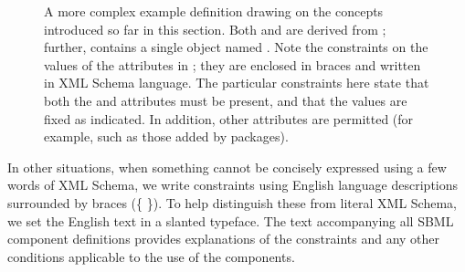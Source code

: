 \begin{figure}[t]
  \centering
  \small
  \caption{A more complex example definition drawing on the
    concepts introduced so far in this section.  Both 
    and  are derived from ;
    further,  contains a single  object
    named .  Note the constraints on the values of
    the attributes in ; they are enclosed in braces
    and written in XML Schema language.  The particular
    constraints here state that both the  and
     attributes must be present, and that the
    values are fixed as indicated.  In addition, other attributes
    are permitted (for example, such as those added by \thisL
    packages).}
  \label{fig:unit-eg}
\end{figure}

In other situations, when something cannot be concisely expressed
using a few words of XML Schema, we write constraints using
English language descriptions surrounded by braces (\{ \}).  To
help distinguish these from literal XML Schema, we set the English
text in a slanted typeface.  The text accompanying all SBML
component definitions provides explanations of the constraints and
any other conditions applicable to the use of the components.



